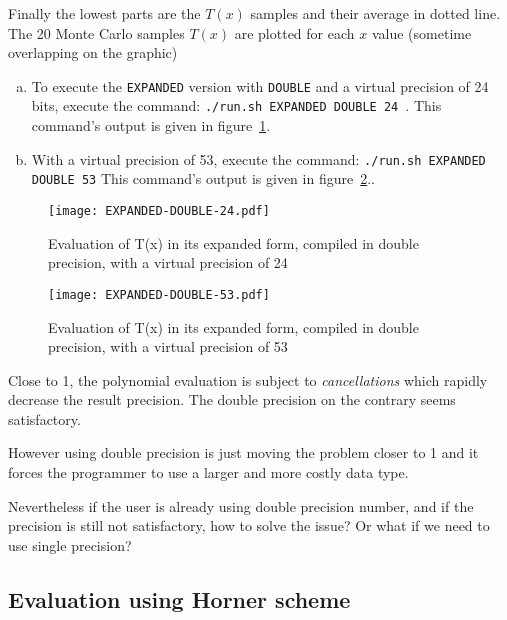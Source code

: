 Finally the lowest parts are the $T(x)$ samples and their average in dotted line. The 20 Monte Carlo samples $T(x)$ are plotted for each $x$ value (sometime overlapping on the graphic)

\begin{question}
\begin{enumerate}[(a)]
\item To execute the {\tt EXPANDED} version with {\tt DOUBLE} and a virtual precision of 24 bits, execute the command: {\tt ./run.sh EXPANDED
      DOUBLE 24 }. \newline This command's output is given in figure~\ref{fig:expanded:double:24}.
  \item With a virtual precision of 53, execute the command: {\tt ./run.sh EXPANDED DOUBLE 53} \newline
  This command's output is given in figure~\ref{fig:expanded:double:53}..
  \end{enumerate}
\end{question}

\begin{figure}[h]
\center \texttt{[image: EXPANDED-DOUBLE-24.pdf]}
  \caption{Evaluation of T(x) in its expanded form, compiled in double precision, with a virtual precision of 24}
  \label{fig:expanded:double:24}
\end{figure}
\begin{figure}[h]
\center \texttt{[image: EXPANDED-DOUBLE-53.pdf]}
  \caption{Evaluation of T(x) in its expanded form, compiled in double precision, with a virtual precision of 53}
  \label{fig:expanded:double:53}
\end{figure}

Close to 1, the polynomial evaluation is subject to {\it cancellations} which rapidly decrease the result precision. The double precision on the contrary seems satisfactory.

However using double precision is just moving the problem closer to 1 and it forces the programmer to use a larger and more costly data type.

Nevertheless if the user is already using double precision number, and if the precision is still not satisfactory, how to solve the issue? Or what if we need to use single precision?

\FloatBarrier

\subsection{Evaluation using Horner scheme}

